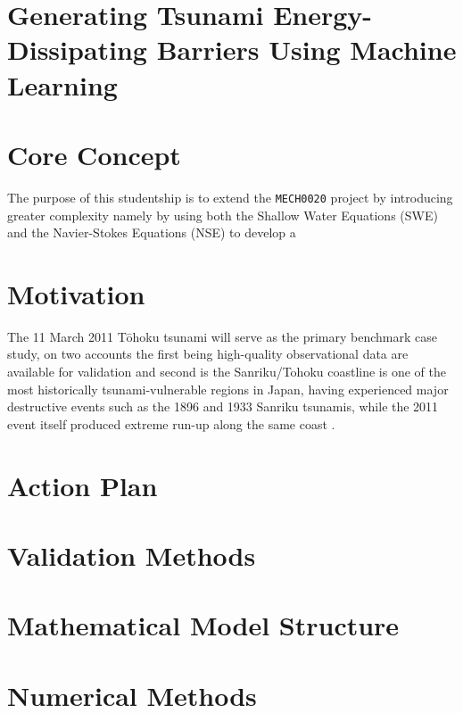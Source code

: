 \documentclass[11pt]{article}
\begin{document}
\tableofcontents
\newpage
{}

\section*{\centering Generating Tsunami Energy-Dissipating Barriers Using Machine Learning}

\section{Core Concept}

The purpose of this studentship is to extend the \texttt{MECH0020} project by introducing greater complexity namely by using both the Shallow Water Equations (SWE) and the Navier-Stokes Equations (NSE) to develop a   

\section{Motivation}

  The 11 March 2011 T\={o}hoku tsunami will serve as the primary benchmark case study, on two accounts the first being high-quality observational data are available for validation \cite{NCEITohokuEvent,Goto2012} and second is the Sanriku/Tohoku coastline is one of the most historically tsunami-vulnerable regions in Japan, having experienced major destructive events such as the 1896 and 1933 Sanriku tsunamis, while the 2011 event itself produced extreme run-up along the same coast \cite{Fujii2011,Satake2014,Goto2012}.

\section{Action Plan}

  

\section{Validation Methods}

\section{Mathematical Model Structure}

\section{Numerical Methods}
\end{document}
